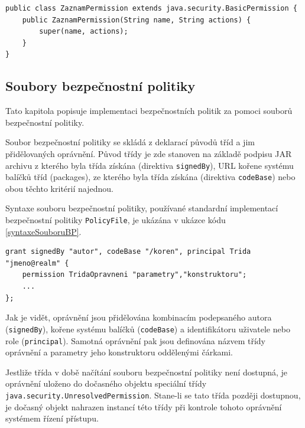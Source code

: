 \begin{lstlisting}[caption=Demonstrační třída oprávnění, label=prikladTridyOpravneni]
public class ZaznamPermission extends java.security.BasicPermission {
    public ZaznamPermission(String name, String actions) {
        super(name, actions);
    }
}
\end{lstlisting}

\subsection{Soubory bezpečnostní politiky} \label{souboryBP}

Tato kapitola popisuje implementaci bezpečnostních politik za pomoci souborů bezpečnostní politiky.

Soubor bezpečnostní politiky se skládá z deklarací původů tříd a jim přidělovaných oprávnění.
Původ třídy je zde stanoven na základě podpisu JAR archivu z kterého byla třída získána (direktiva {\tt signedBy}), URL kořene systému balíčků tříd (packages), ze kterého byla třída získána (direktiva {\tt codeBase}) nebo obou těchto kritérií najednou. \cite[5.3.1]{oaks}

Syntaxe souboru bezpečnostní politiky, používané standardní implementací bezpečnostní politiky {\tt PolicyFile}, je ukázána v ukázce kódu \ref{syntaxeSouboruBP}. \cite[5.3.1]{oaks}\cite{refPolicyFiles}

\begin{lstlisting}[caption=Syntaxe souboru bezpečnostní politiky, label=syntaxeSouboruBP]
grant signedBy "autor", codeBase "/koren", principal Trida "jmeno@realm" {
    permission TridaOpravneni "parametry","konstruktoru";
    ...
};
\end{lstlisting}

Jak je vidět, oprávnění jsou přidělována kombinacím podepsaného autora ({\tt signedBy}), kořene systému balíčků ({\tt codeBase}) a identifikátoru uživatele nebo role ({\tt principal}).
Samotná oprávnění pak jsou definována názvem třídy oprávnění a parametry jeho konstruktoru oddělenými čárkami.

Jestliže třída v době načítání souboru bezpečnostní politiky není dostupná, je oprávnění uloženo do dočasného objektu speciální třídy {\tt java.security.UnresolvedPermission}.
Stane-li se tato třída později dostupnou, je dočasný objekt nahrazen instancí této třídy při kontrole tohoto oprávnění systémem řízení přístupu. \cite{refUnresolvedPermission}

